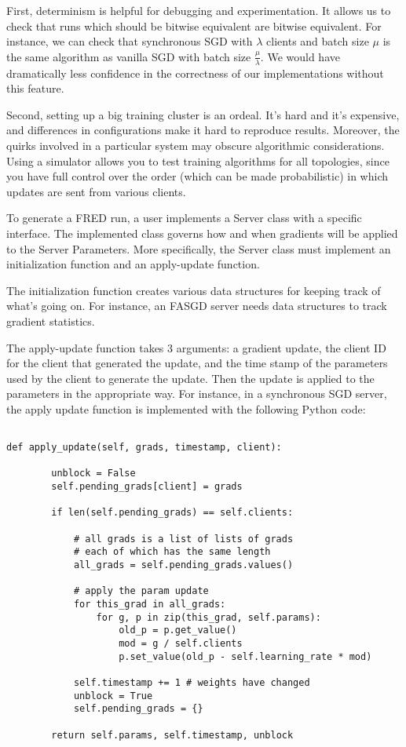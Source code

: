 \documentclass{article} %
\begin{document}
First, determinism is helpful for debugging and experimentation.
It allows us to check that runs which should be bitwise equivalent are bitwise equivalent.
For instance, we can check that synchronous SGD with $\lambda$ clients and batch size $\mu$ is the same
algorithm as vanilla SGD with batch size $\frac{\mu}{\lambda}$.
We would have dramatically less confidence in the correctness of our implementations without this feature.

Second, setting up a big training cluster is an ordeal.
It's hard and it's expensive, and differences in configurations make
it hard to reproduce results.
Moreover, the quirks involved in a particular system may obscure algorithmic considerations.
Using a simulator allows you to test training algorithms for all topologies, since you
have full control over the order (which can be made probabilistic) in which updates are
sent from various clients.

To generate a FRED run, a user implements a Server class with a specific interface.
The implemented class governs how and when gradients will be applied to the Server Parameters.
More specifically, the Server class must implement an initialization function and an apply-update function.

The initialization function creates various data structures for keeping track of what's going on.
For instance, an FASGD server needs data structures to track gradient statistics.

The apply-update function takes 3 arguments: a gradient update, the client ID for the client that generated
the update, and the time stamp of the parameters used by the client to generate the update.
Then the update is applied to the parameters in the appropriate way.
For instance, in a synchronous SGD server, the apply update function is implemented with the
following Python code:

\begin{verbatim}

def apply_update(self, grads, timestamp, client):

        unblock = False
        self.pending_grads[client] = grads

        if len(self.pending_grads) == self.clients:

            # all grads is a list of lists of grads
            # each of which has the same length
            all_grads = self.pending_grads.values()

            # apply the param update
            for this_grad in all_grads:
                for g, p in zip(this_grad, self.params):
                    old_p = p.get_value()
                    mod = g / self.clients 
                    p.set_value(old_p - self.learning_rate * mod)

            self.timestamp += 1 # weights have changed
            unblock = True
            self.pending_grads = {}

        return self.params, self.timestamp, unblock
\end{verbatim}
\end{document}
